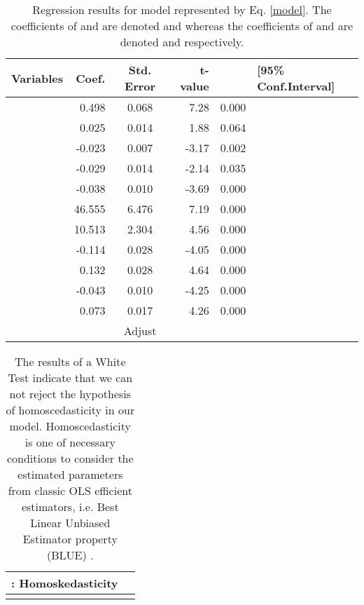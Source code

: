 \documentclass[10pt]{article}
\begin{document}
 \begin {table}
 \begin {center}
	 \begin {tabular} {lrcrcl}
	 \hline
	Variables                    &	Coef.	&	Std. Error	&	 t-value	         &		      &  	[95\% Conf.Interval]		\\
	 \hline
	
	 	         &	0.498	&	0.068	&	7.28	         &	0.000	       &		\\
		                 &	0.025	&	0.014	&	1.88	         &	0.064	       &		\\
		                 &	-0.023	&	0.007	&	-3.17  	&	0.002	       &		\\
		                 &	-0.029	&	0.014	&	-2.14	         &	0.035	       &		\\
		                 &	-0.038	&	0.010	&	-3.69	         &	0.000               &		\\
	               	&	46.555      &	6.476	&	7.19	         &	0.000              &		\\
		                 &	10.513	&	2.304	&	4.56	        &	0.000	        &		\\
		         &	-0.114	&	0.028	&	-4.05	        &	0.000	        &		\\
		         &	0.132	&	0.028	&	4.64	        &	0.000	        &		\\
		         &	-0.043	&	0.010	&	-4.25	        &	0.000	        &		\\
		         &	0.073	&	0.017	&	4.26	        &	0.000	        &		\\
	
	 \hline
	 			&&	Adjust 			   &              &					\\
	 \hline
	 \end {tabular}
	 \caption{Regression results for model represented by Eq. \ref{model}. The coefficients of  and  are denoted  and  whereas the coefficients of  and  are denoted  and  respectively.}
	 \label{RegressionResults}
 \end{center}
 \end {table}

 \begin {table}
	 \begin {center}
		 \begin {tabular} {ll}
		\hline
		: Homoskedasticity    &  \\
		\hline
		                         &  \\
		\hline
		 \end {tabular}
	 \caption{ \label{WhiteTest}The results of a White Test indicate that we can not reject the hypothesis of homoscedasticity in our model. Homoscedasticity is one of necessary conditions to consider the estimated parameters from classic OLS efficient  estimators, i.e. Best Linear Unbiased Estimator property (BLUE) \cite{Gujarati2008}.}
	  \end{center}
 \end {table}
\end{document}
